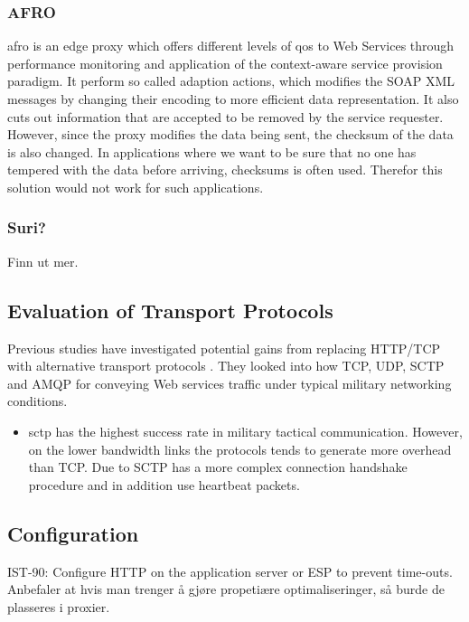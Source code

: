 \subsubsection{AFRO}

\gls{afro} is an edge proxy which offers different levels of \gls{qos} to Web
Services through performance monitoring and application of the context-aware
service provision paradigm. It perform so called adaption actions, which
modifies the SOAP XML messages by changing their encoding to more efficient data
representation. It also cuts out information that are accepted to be removed by
the service requester. However, since the proxy modifies the data being sent,
the checksum of the data is also changed. In applications where we want to be
sure that no one has tempered with the data before arriving, checksums is often
used. Therefor this solution would not work for such applications.


\subsubsection{Suri?}
Finn ut mer.


\subsection{Evaluation of Transport Protocols}

Previous studies have investigated potential gains from replacing HTTP/TCP
with alternative transport protocols
\cite{evaluation-transport-protocols-web-services}. They looked into how TCP,
UDP, SCTP and AMQP for conveying Web services traffic under typical military
networking conditions.

\begin{itemize}
    \item \gls{sctp} has the highest success rate in military tactical
    communication. However, on the lower bandwidth links the protocols tends to
     generate more overhead than TCP. Due to SCTP has a more complex connection
     handshake procedure and in addition use heartbeat packets.
\end{itemize}

\subsection{Configuration}
IST-90: Configure HTTP on the application server or ESP to prevent time-outs.
Anbefaler at hvis man trenger å gjøre propetiære optimaliseringer, så burde de
plasseres i proxier.


